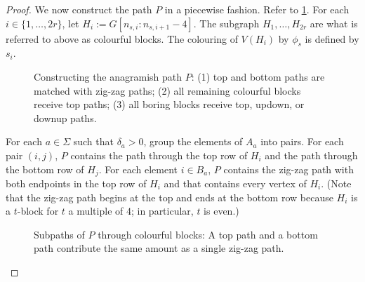 \documentclass{patmorin}
\begin{document}
\begin{proof}
    We now construct the path $P$ in a piecewise fashion.  Refer to \cref{path_construction}.  For each $i\in\{1,\ldots,2r\}$, let $H_i:=G[n_{s,i}:n_{s,i+1}-4]$. The subgraph $H_1,\ldots,H_{2r}$ are what is referred to above as colourful blocks.  The colouring of $V(H_i)$ by $\phi_s$ is defined by $s_i$.
    \begin{figure}
        \caption{Constructing the anagramish path $P$:
            (1) top and bottom paths are matched with zig-zag paths;
            (2) all remaining colourful blocks receive top paths;
            (3) all boring blocks receive top, updown, or downup paths.
        }
        \label{path_construction}
    \end{figure}
    \begin{compactenum}
        \item For each $a\in\Sigma$ such that $\delta_a>0$, group the elements of $A_a$ into pairs.  For each pair $(i,j)$, $P$ contains the path through the top row of $H_i$ and the path through the bottom row of $H_j$.  For each element $i\in B_a$, $P$ contains the zig-zag path with both endpoints in the top row of $H_i$ and that contains every vertex of $H_i$.  (Note that the zig-zag path begins at the top and ends at the bottom row because $H_i$ is a $t$-block for $t$ a multiple of $4$; in particular, $t$ is even.)

        \begin{figure}
            \caption{Subpaths of $P$ through colourful blocks: A top path and a bottom path contribute the same amount as a single zig-zag path.}
        \end{figure}



\end{compactenum}
\end{proof}
\end{document}
